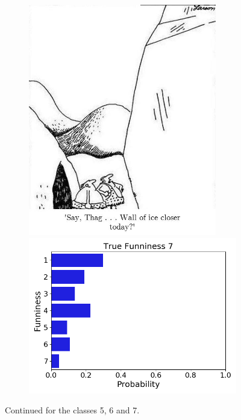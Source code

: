 \documentclass[draft,final,oneside]{vutinfth} %
\begin{document}
\begin{figure}
\begin{subfigure}[b]{0.45\textwidth}
\centering
\includegraphics[width=0.9\textwidth,height=0.3\textheight,keepaspectratio]{graphics/detail/Test_for_Image_7_cartoon} \\
\includegraphics[width=1.0\textwidth]{graphics/detail/Test_for_Image_7}
\end{subfigure}\quad
\caption{Continued for the classes 5, 6 and 7.}
\label{fig:figdistr2}

\end{figure}
\end{document}

